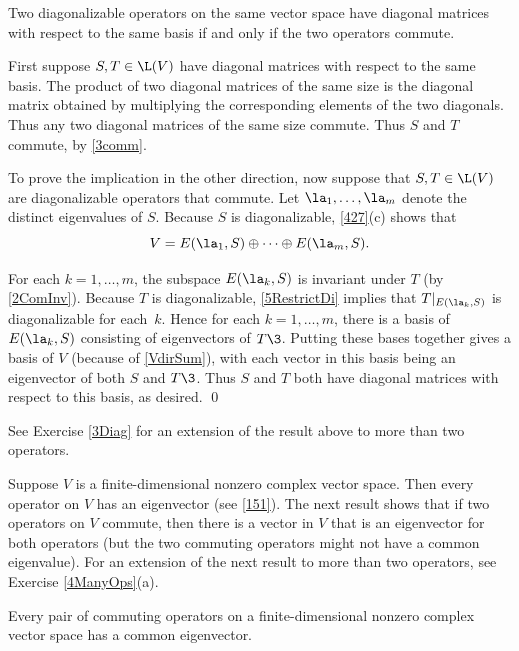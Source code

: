 {Two diagonalizable operators on the same vector space have diagonal matrices with respect to the same basis if and only if the two operators commute.}

\proof
First suppose $S, T \in \L(V)$ have diagonal matrices with respect to the same basis. The product of two diagonal matrices of the same size is the diagonal matrix obtained by multiplying the corresponding elements of the two diagonals. Thus any two diagonal matrices of the same size commute. Thus $S$ and $T$ commute, by \ref{3comm}.

\pagebreak[3]

To prove the implication in the other direction, now suppose that $S, T \in \L(V)$ are diagonalizable operators that commute. Let $\la_1, \ldots, \la_m$ denote the distinct eigenvalues of $S$. Because $S$ is diagonalizable, \ref{427}(c) shows that
\begin{equation} \label{VdirSum}
V = E(\la_1, S) \oplus \cdots \oplus E(\la_m, S).
\end{equation}%

 For each $k = 1, \ldots, m$, the subspace $E(\la_k, S)$ is invariant under $T$ (by \ref{2ComInv}). Because $T$ is diagonalizable, \ref{5RestrictDi} implies that $T|_{E(\la_k, S)}$ is diagonalizable for each~$k$. Hence for each $k=1, \ldots, m$, there is a basis of $E(\la_k, S)$ consisting of eigenvectors of $T\3$. Putting these bases together gives a basis of $V$ (because of \ref{VdirSum}), with each vector in this basis being an eigenvector of both $S$ and $T\3$. Thus $S$ and $T$ both have diagonal matrices with respect to this basis, as desired.
\qed

See Exercise \ref{3Diag} for an extension of the result above to more than two operators.

Suppose $V$ is a finite-dimensional nonzero complex vector space. Then every operator on $V$ has an eigenvector (see \ref{151}). The next result shows that if two operators on $V$ commute, then there is a vector in $V$ that is an eigenvector for both operators (but the two commuting operators might not have a common eigenvalue). For an extension of the next result to more than two operators, see Exercise \ref{4ManyOps}(a).

{Every pair of commuting operators on a finite-dimensional nonzero complex vector space has a common eigenvector.}

